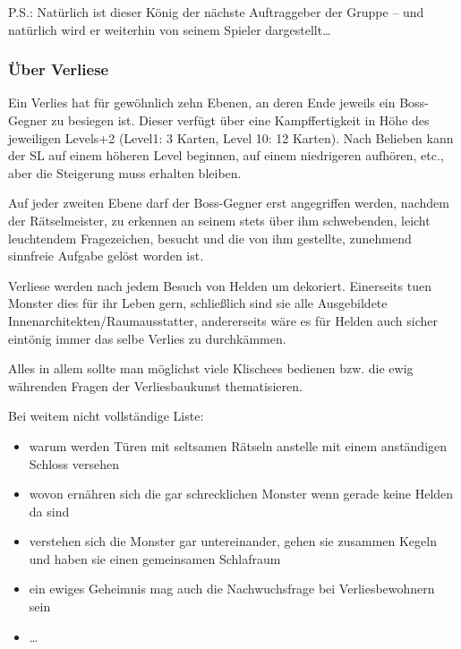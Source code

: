 P.S.: Natürlich ist dieser König der nächste Auftraggeber der Gruppe -- und natürlich wird er weiterhin von seinem Spieler dargestellt\dots

 
\subsubsection{Über Verliese}

Ein Verlies hat für gewöhnlich zehn Ebenen, an deren Ende jeweils ein Boss-Gegner zu besiegen ist. Dieser verfügt über eine Kampffertigkeit in Höhe des jeweiligen Levels+2 (Level1: 3 Karten, Level 10: 12 Karten). Nach Belieben kann der SL auf einem höheren Level beginnen, auf einem niedrigeren aufhören, etc., aber die Steigerung muss erhalten bleiben.

Auf jeder zweiten Ebene darf der Boss-Gegner erst angegriffen werden, nachdem der Rätselmeister\texttrademark, zu erkennen an seinem stets über ihm schwebenden, leicht leuchtendem Fragezeichen, besucht und die von ihm gestellte, zunehmend sinnfreie Aufgabe gelöst worden ist.

Verliese werden nach jedem Besuch von Helden um dekoriert. Einerseits tuen Monster dies für ihr Leben gern, schließlich sind sie alle Ausgebildete Innenarchitekten/Raumausstatter, andererseits wäre es für Helden auch sicher eintönig immer das selbe Verlies zu durchkämmen.

Alles in allem sollte man möglichst viele Klischees bedienen bzw. die ewig währenden Fragen der Verliesbaukunst thematisieren.

Bei weitem nicht vollständige Liste:
\begin{itemize}
\item warum werden Türen mit seltsamen Rätseln anstelle mit einem anständigen Schloss versehen
\item wovon ernähren sich die gar schrecklichen Monster wenn gerade keine Helden da sind
\item verstehen sich die Monster gar untereinander, gehen sie zusammen Kegeln und haben sie einen gemeinsamen Schlafraum
\item ein ewiges Geheimnis mag auch die Nachwuchsfrage bei Verliesbewohnern sein
\item \dots
\end{itemize}

 


